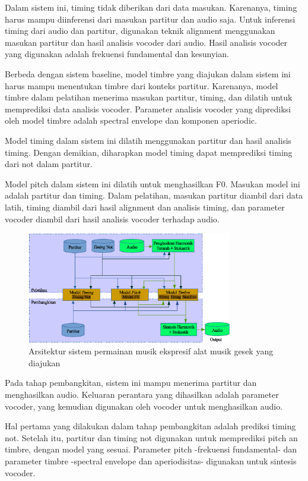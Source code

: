 Dalam sistem ini, timing tidak diberikan dari data masukan. Karenanya, timing harus mampu diinferensi dari masukan partitur dan audio saja. Untuk inferensi timing dari audio dan partitur, digunakan teknik alignment menggunakan masukan partitur dan hasil analisis vocoder dari audio. Hasil analisis vocoder yang digunakan adalah frekuensi fundamental dan kesunyian.

Berbeda dengan sistem baseline, model timbre yang diajukan dalam sistem ini harus mampu menentukan timbre dari konteks partitur. Karenanya, model timbre dalam pelatihan menerima masukan partitur, timing, dan dilatih untuk memprediksi data analisis vocoder. Parameter analisis vocoder yang diprediksi oleh model timbre adalah spectral envelope dan komponen aperiodic.

Model timing dalam sistem ini dilatih menggunakan partitur dan hasil analisis timing. Dengan demikian, diharapkan model timing dapat memprediksi timing dari not dalam partitur.

Model pitch dalam sistem ini dilatih untuk menghasilkan F0. Masukan model ini adalah partitur dan timing. Dalam pelatihan, masukan partitur diambil dari data latih, timing diambil dari hasil alignment dan analisis timing, dan parameter vocoder diambil dari hasil analisis vocoder terhadap audio.

\begin{figure}[h]
    \centering
    \includegraphics[width=0.8\textwidth]{resources/system-overview.eps}
    \caption{Arsitektur sistem permainan musik ekspresif alat musik gesek yang diajukan}\label{fig-system-overview}
\end{figure}

Pada tahap pembangkitan, sistem ini mampu menerima partitur dan menghasilkan audio. Keluaran perantara yang dihasilkan adalah parameter vocoder, yang kemudian digunakan oleh vocoder untuk menghasilkan audio.

Hal pertama yang dilakukan dalam tahap pembangkitan adalah prediksi timing not. Setelah itu, partitur dan timing not digunakan untuk memprediksi pitch an timbre, dengan model yang sesuai. Parameter pitch -frekuensi fundamental- dan parameter timbre -spectral envelope dan aperiodisitas- digunakan untuk sintesis vocoder.

